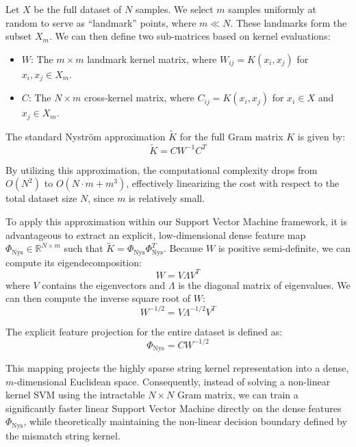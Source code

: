 Let $X$ be the full dataset of $N$ samples. We select $m$ samples uniformly at random to serve as ``landmark'' points, where $m \ll N$. These landmarks form the subset $X_m$. We can then define two sub-matrices based on kernel evaluations:
\begin{itemize}
    \item $W$: The $m \times m$ landmark kernel matrix, where $W_{ij} = K(x_i, x_j)$ for $x_i, x_j \in X_m$.
    \item $C$: The $N \times m$ cross-kernel matrix, where $C_{ij} = K(x_i, x_j)$ for $x_i \in X$ and $x_j \in X_m$.
\end{itemize}

The standard Nystr\"{o}m approximation $\tilde{K}$ for the full Gram matrix $K$ is given by:
\begin{equation}\label{eq:nystrom-approx}
\tilde{K} = C W^{-1} C^T
\end{equation}

By utilizing this approximation, the computational complexity drops from $O(N^2)$ to $O(N \cdot m + m^3)$, effectively linearizing the cost with respect to the total dataset size $N$, since $m$ is relatively small.

To apply this approximation within our Support Vector Machine framework, it is advantageous to extract an explicit, low-dimensional dense feature map $\Phi_{\text{Nys}} \in \mathbb{R}^{N \times m}$ such that $\tilde{K} = \Phi_{\text{Nys}} \Phi_{\text{Nys}}^T$.
Because $W$ is positive semi-definite, we can compute its eigendecomposition:
\begin{equation}\label{eq:w-eigendecomp}
W = V \Lambda V^T
\end{equation}
where $V$ contains the eigenvectors and $\Lambda$ is the diagonal matrix of eigenvalues. We can then compute the inverse square root of $W$:
\begin{equation}\label{eq:w-inv-sqrt}
W^{-1/2} = V \Lambda^{-1/2} V^T
\end{equation}

The explicit feature projection for the entire dataset is defined as:
\begin{equation}\label{eq:nystrom-feature-map}
\Phi_{\text{Nys}} = C W^{-1/2}
\end{equation}

This mapping projects the highly sparse string kernel representation into a dense, $m$-dimensional Euclidean space. Consequently, instead of solving a non-linear kernel SVM using the intractable $N \times N$ Gram matrix, we can train a significantly faster linear Support Vector Machine directly on the dense features $\Phi_{\text{Nys}}$, while theoretically maintaining the non-linear decision boundary defined by the mismatch string kernel.

